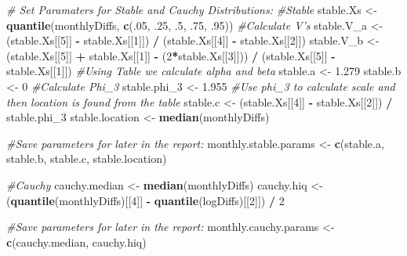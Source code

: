 \documentclass[]{article}
\newenvironment{Shaded}{\begin{snugshade}}{\end{snugshade}}
\newcommand{\CommentTok}[1]{\textcolor[rgb]{0.56,0.35,0.01}{\textit{#1}}}
\newcommand{\DecValTok}[1]{\textcolor[rgb]{0.00,0.00,0.81}{#1}}
\newcommand{\FloatTok}[1]{\textcolor[rgb]{0.00,0.00,0.81}{#1}}
\newcommand{\KeywordTok}[1]{\textcolor[rgb]{0.13,0.29,0.53}{\textbf{#1}}}
\newcommand{\NormalTok}[1]{#1}
\newcommand{\OperatorTok}[1]{\textcolor[rgb]{0.81,0.36,0.00}{\textbf{#1}}}
\newcommand{\StringTok}[1]{\textcolor[rgb]{0.31,0.60,0.02}{#1}}
\begin{document}
\begin{Shaded}
\begin{Highlighting}[]
{\CommentTok{# Set Paramaters for Stable and Cauchy Distributions:}
\CommentTok{#Stable}
\NormalTok{stable.Xs <-}\StringTok{ }\KeywordTok{quantile}\NormalTok{(monthlyDiffs, }\KeywordTok{c}\NormalTok{(.}\DecValTok{05}\NormalTok{, }\FloatTok{.25}\NormalTok{, }\FloatTok{.5}\NormalTok{, }\FloatTok{.75}\NormalTok{, }\FloatTok{.95}\NormalTok{))}
\CommentTok{#Calculate V's}
\NormalTok{stable.V_a <-}\StringTok{ }\NormalTok{(stable.Xs[[}\DecValTok{5}\NormalTok{]] }\OperatorTok{-}\StringTok{ }\NormalTok{stable.Xs[[}\DecValTok{1}\NormalTok{]]) }\OperatorTok{/}\StringTok{ }\NormalTok{(stable.Xs[[}\DecValTok{4}\NormalTok{]] }\OperatorTok{-}\StringTok{ }\NormalTok{stable.Xs[[}\DecValTok{2}\NormalTok{]])}
\NormalTok{stable.V_b <-}\StringTok{ }\NormalTok{(stable.Xs[[}\DecValTok{5}\NormalTok{]] }\OperatorTok{+}\StringTok{ }\NormalTok{stable.Xs[[}\DecValTok{1}\NormalTok{]] }\OperatorTok{-}\StringTok{ }\NormalTok{(}\DecValTok{2}\OperatorTok{*}\NormalTok{stable.Xs[[}\DecValTok{3}\NormalTok{]])) }\OperatorTok{/}\StringTok{ }\NormalTok{(stable.Xs[[}\DecValTok{5}\NormalTok{]] }\OperatorTok{-}\StringTok{ }\NormalTok{stable.Xs[[}\DecValTok{1}\NormalTok{]])}
\CommentTok{#Using Table we calculate alpha and beta}
\NormalTok{stable.a <-}\StringTok{ }\FloatTok{1.279}
\NormalTok{stable.b <-}\StringTok{ }\DecValTok{0}
\CommentTok{#Calculate Phi_3 }
\NormalTok{stable.phi_}\DecValTok{3}\NormalTok{ <-}\StringTok{ }\FloatTok{1.955}
\CommentTok{#Use phi_3 to calculate scale and then location is found from the table }
\NormalTok{stable.c <-}\StringTok{ }\NormalTok{(stable.Xs[[}\DecValTok{4}\NormalTok{]] }\OperatorTok{-}\StringTok{ }\NormalTok{stable.Xs[[}\DecValTok{2}\NormalTok{]]) }\OperatorTok{/}\StringTok{ }\NormalTok{stable.phi_}\DecValTok{3}
\NormalTok{stable.location <-}\StringTok{ }\KeywordTok{median}\NormalTok{(monthlyDiffs)}

\CommentTok{#Save parameters for later in the report:}
\NormalTok{monthly.stable.params <-}\StringTok{ }\KeywordTok{c}\NormalTok{(stable.a, stable.b, stable.c, stable.location)}


\CommentTok{#Cauchy}
\NormalTok{cauchy.median <-}\StringTok{ }\KeywordTok{median}\NormalTok{(monthlyDiffs)}
\NormalTok{cauchy.hiq <-}\StringTok{ }\NormalTok{(}\KeywordTok{quantile}\NormalTok{(monthlyDiffs)[[}\DecValTok{4}\NormalTok{]] }\OperatorTok{-}\StringTok{ }\KeywordTok{quantile}\NormalTok{(logDiffs)[[}\DecValTok{2}\NormalTok{]]) }\OperatorTok{/}\StringTok{ }\DecValTok{2}

\CommentTok{#Save parameters for later in the report:}
\NormalTok{monthly.cauchy.params <-}\StringTok{ }\KeywordTok{c}\NormalTok{(cauchy.median, cauchy.hiq)}

}
\end{Highlighting}
\end{Shaded}
\end{document}

